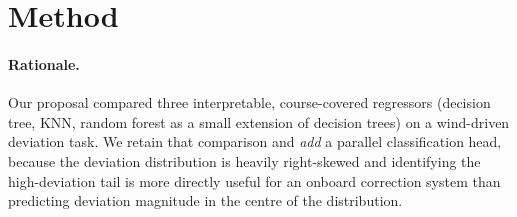 \documentclass[10pt]{article}
\begin{document}
\section{Method}

\paragraph{Rationale.} Our proposal compared three interpretable, course-covered regressors (decision tree, KNN, random forest as a small extension of decision trees) on a wind-driven deviation task. We retain that comparison and \emph{add} a parallel classification head, because the deviation distribution is heavily right-skewed and identifying the high-deviation tail is more directly useful for an onboard correction system than predicting deviation magnitude in the centre of the distribution.
\end{document}
